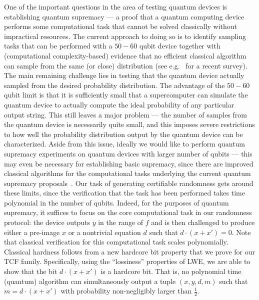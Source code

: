 \documentclass[11pt]{article}
\theoremstyle{remark}
\theoremstyle{definition}
\begin{document}
One of the important questions in the area of testing quantum devices is establishing quantum supremacy --- a proof that a quantum computing device performs some 
computational task that cannot be solved classically without impractical resources. The current approach to doing so is to identify sampling tasks that can be performed with
a $50-60$ qubit device together with (computational complexity-based) evidence that no efficient classical algorithm can sample from the same (or close) distribution (see e.g.~\cite{harrow2017quantum} for a recent survey). The main remaining challenge lies in testing that the quantum device actually sampled from the desired probability distribution. The advantage of the $50-60$ qubit limit is that it is sufficiently small that a supercomputer can simulate the quantum device to actually compute the ideal probability of any particular output string. This still leaves a major problem --- the number of samples from the quantum device is necessarily quite small, and this imposes severe restrictions to how well the probability distribution output by the quantum device can be characterized. Aside from this issue,
ideally we would like to perform quantum supremacy experiments on quantum devices with larger number of qubits --- 
this may even be necessary for establishing basic supremacy, since there are improved classical algorithms for the computational tasks underlying the current quantum supremacy proposals~\cite{pednault2017breaking,clifford2018classical}. Our task of generating certifiable randomness gets around these limits, since the verification that the task has been performed takes time polynomial in the number of qubits. Indeed, for the purposes of quantum supremacy, it suffices to focus on the core computational task in our randomness protocol: the device outputs $y$ in the range of $f$ and is then challenged to produce either a pre-image $x$ or a nontrivial equation $d$ such that  $d\cdot(x + x') = 0$. Note that classical verification for this computational task
scales polynomially. 
%
Classical hardness follows from a new hardcore bit property that we prove for our TCF family. Specifically, using the ``lossiness'' properties of LWE, we are able to show that the bit $d\cdot(x + x')$ is a hardcore bit. That is, no polynomial time (quantum) algorithm 
can simultaneously output a tuple $(x, y, d, m)$ such that $m=d\cdot(x + x')$ with probability non-negligibly larger than $\frac{1}{2}$. 
\end{document}
